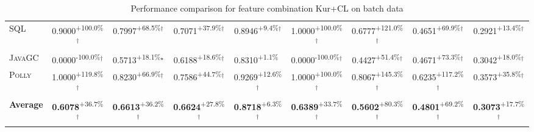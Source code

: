 \begin{table}[htbp]
\begin{tabular}{l|cccc|cccc}
\textsc{SQL} & \cellcolor{green!30}0.9000\textsuperscript{+100.0\%}$^\dagger$ & \cellcolor{green!30}0.7997\textsuperscript{+68.5\%}$^\dagger$ & \cellcolor{green!30}0.7071\textsuperscript{+37.9\%}$^\dagger$ & \cellcolor{green!30}0.8946\textsuperscript{+9.4\%}$^\dagger$ & \cellcolor{green!30}1.0000\textsuperscript{+100.0\%}$^\dagger$ & \cellcolor{green!30}0.6777\textsuperscript{+121.0\%}$^\dagger$ & \cellcolor{green!30}0.4651\textsuperscript{+69.9\%}$^\dagger$ & \cellcolor{green!30}0.2921\textsuperscript{+13.4\%}$^\dagger$ \\
\textsc{JavaGC} & \cellcolor{red!30}0.0000\textsuperscript{-100.0\%}$^\dagger$ & \cellcolor{green!30}0.5713\textsuperscript{+18.1\%}$^\star$ & \cellcolor{green!30}0.6188\textsuperscript{+18.6\%}$^\dagger$ & \cellcolor{green!30}0.8310\textsuperscript{+1.1\%}$^{\,\,\,}$ & \cellcolor{red!30}0.0000\textsuperscript{-100.0\%}$^\dagger$ & \cellcolor{green!30}0.4427\textsuperscript{+51.4\%}$^\dagger$ & \cellcolor{green!30}0.4671\textsuperscript{+73.3\%}$^\dagger$ & \cellcolor{green!30}0.3042\textsuperscript{+18.0\%}$^\dagger$ \\
\textsc{Polly} & \cellcolor{green!30}1.0000\textsuperscript{+119.8\%}$^\dagger$ & \cellcolor{green!30}0.8230\textsuperscript{+66.9\%}$^\dagger$ & \cellcolor{green!30}0.7586\textsuperscript{+44.7\%}$^\dagger$ & \cellcolor{green!30}0.9269\textsuperscript{+12.6\%}$^\dagger$ & \cellcolor{green!30}1.0000\textsuperscript{+100.0\%}$^\dagger$ & \cellcolor{green!30}0.8067\textsuperscript{+145.3\%}$^\dagger$ & \cellcolor{green!30}0.6235\textsuperscript{+117.2\%}$^\dagger$ & \cellcolor{green!30}0.3573\textsuperscript{+35.8\%}$^\dagger$ \\
\hline
\textbf{Average} & \cellcolor{green!30}\textbf{0.6078}\textsuperscript{+36.7\%}$^\dagger$ & \cellcolor{green!30}\textbf{0.6613}\textsuperscript{+36.2\%}$^\dagger$ & \cellcolor{green!30}\textbf{0.6624}\textsuperscript{+27.8\%}$^\dagger$ & \cellcolor{green!30}\textbf{0.8718}\textsuperscript{+6.3\%}$^\dagger$ & \cellcolor{green!30}\textbf{0.6389}\textsuperscript{+33.7\%}$^\dagger$ & \cellcolor{green!30}\textbf{0.5602}\textsuperscript{+80.3\%}$^\dagger$ & \cellcolor{green!30}\textbf{0.4801}\textsuperscript{+69.2\%}$^\dagger$ & \cellcolor{green!30}\textbf{0.3073}\textsuperscript{+17.7\%}$^\dagger$ \\
\hline
\end{tabular}
\caption{Performance comparison for feature combination Kur+CL on batch data}
\label{tab:combo_Kur_CL_performance_batch}
\end{table}